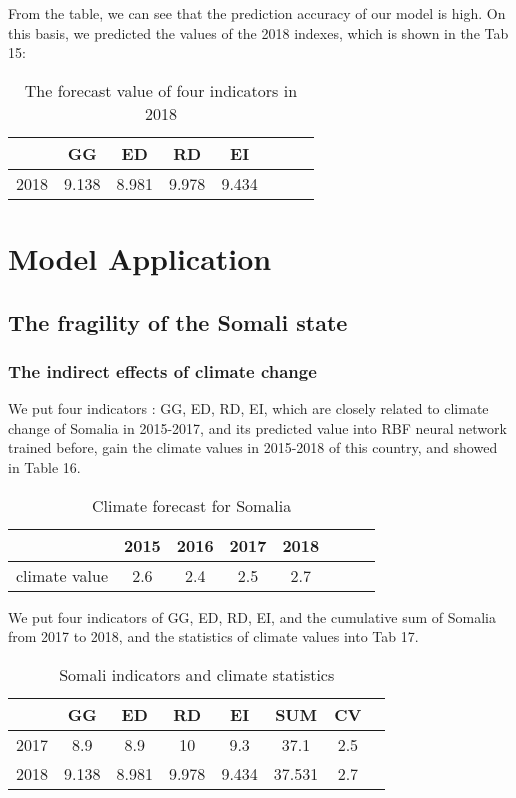 \documentclass{mcmthesis}
\begin{document}
From the table, we can see that the prediction accuracy of our model is high. On this basis, we predicted the values of the 2018 indexes, which is shown in the Tab 15:

\begin{table}[htbp]
\centering
\caption{The forecast value of four indicators in 2018}
\begin{tabular}{c|ccccccc}   %
\hline
 & GG & ED & RD  & EI \\
\hline
2018 &9.138 &8.981 &	9.978&	9.434\\
\hline
\end{tabular}
\end{table}

\section{Model Application}
\subsection{The fragility of the Somali state}
\subsubsection{The indirect effects of climate change}
We put four indicators : GG, ED, RD, EI, which are closely related to climate change of Somalia in 2015-2017,  and its predicted value into RBF neural network trained before, gain the climate values in 2015-2018 of this country, and showed in Table 16.
\begin{table}[htbp]
\centering
\caption{Climate forecast for Somalia}
\begin{tabular}{c|ccccccc}   %
\hline
 &2015	&2016	&2017 &2018\\
\hline
climate value 	&2.6	&2.4&	2.5&2.7\\
\hline
\end{tabular}
\end{table}

We put four indicators of GG, ED, RD, EI, and the cumulative sum of Somalia from 2017 to 2018, and the statistics of climate values into Tab 17.
\begin{table}[htbp]
\centering
\caption{Somali indicators and climate statistics}
\begin{tabular}{c|ccccccc}   %
\hline
 & GG & ED & RD  & EI &SUM & CV \\
\hline
2017 &8.9&	8.9&	10&	9.3&37.1&	2.5\\
2018 &9.138&	8.981&	9.978&	9.434&37.531&2.7\\

\hline
\end{tabular}
\end{table}
\end{document}
